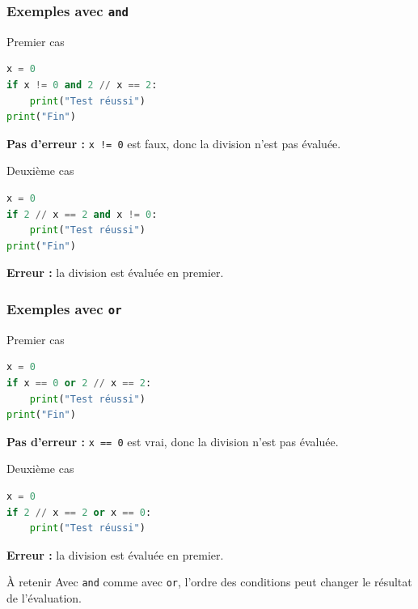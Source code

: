 \documentclass[10pt]{beamer}
\begin{document}
\begin{frame}[containsverbatim]
	\frametitle{Exemples avec \texttt{and}}
	
	
	\begin{exampleblock}{Premier cas}
\begin{lstlisting}[language=Python]	
x = 0
if x != 0 and 2 // x == 2:
	print("Test réussi")
print("Fin")
\end{lstlisting}
		\centering
		\textbf{Pas d'erreur :} \texttt{x != 0} est faux, donc la division n'est pas évaluée.
	\end{exampleblock}
	
	
	\vspace{0.15cm}
	
	\begin{exampleblock}{Deuxième cas}
\begin{lstlisting}[language=Python]
x = 0
if 2 // x == 2 and x != 0:
	print("Test réussi")
print("Fin")
\end{lstlisting}
\centering
\textbf{Erreur :} la division est évaluée en premier.
\end{exampleblock}
	
\end{frame}
\begin{frame}[containsverbatim]
	\frametitle{Exemples avec \texttt{or}}
	
	
	\begin{exampleblock}{Premier cas}
\begin{lstlisting}[language=Python]
x = 0
if x == 0 or 2 // x == 2:
	print("Test réussi")
print("Fin")
\end{lstlisting}
		\centering
		\textbf{Pas d'erreur :} \texttt{x == 0} est vrai,
		donc la division n'est pas évaluée.
	\end{exampleblock}
	
	

	
	\begin{exampleblock}{Deuxième cas}
\begin{lstlisting}[language=Python]
x = 0
if 2 // x == 2 or x == 0:
	print("Test réussi")
\end{lstlisting}
		\centering
		\textbf{Erreur :} la division est évaluée en premier.
	\end{exampleblock}
	
	

	
	\begin{block}{À retenir}
		Avec \texttt{and} comme avec \texttt{or}, l'ordre des conditions
		peut changer le résultat de l'évaluation.
	\end{block}
	
	
\end{frame}
\end{document}

